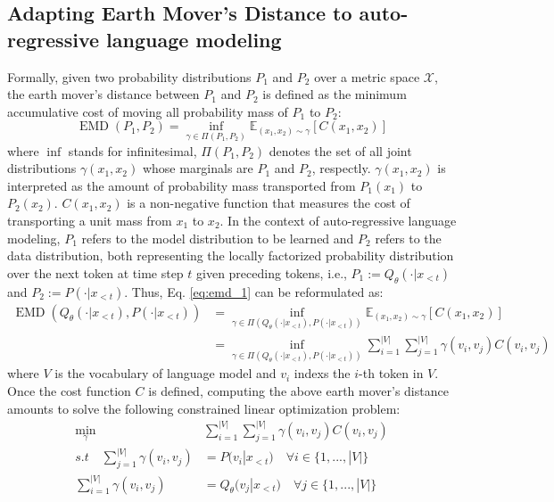 \subsection{Adapting Earth Mover's Distance to auto-regressive language modeling}
\label{sec:emd}
Formally, given two probability distributions $P_1$ and $P_2$ over a metric space $\mathcal{X}$, the earth mover's distance between $P_1$ and $P_2$ is defined as the minimum accumulative cost of moving all probability mass of $P_1$ to $P_2$:
\begin{equation}
    \operatorname{EMD}(P_1, P_2)=\inf _{\gamma \in \Pi(P_1, P_2)} \mathbb{E}_{(x_1, x_2) \sim \gamma}[C(x_1, x_2)]
    \label{eq:emd_1}
\end{equation}
where $\inf$ stands for infinitesimal, $\Pi(P_1,P_2)$ denotes the set of all joint distributions $\gamma (x_1,x_2)$ whose marginals are $P_1$ and $P_2$, respectly. $\gamma(x_1,x_2)$ is interpreted as the amount of probability mass transported from $P_1(x_1)$ to $P_2(x_2)$. $C(x_1,x_2)$ is a non-negative function that measures the cost of transporting a unit mass from $x_1$ to $x_2$. In the context of 
auto-regressive language modeling, $P_1$ refers to the model distribution to be learned and $P_2$ refers to the data distribution, both representing the locally factorized probability distribution over the next token at time step $t$ given preceding tokens, i.e., $P_1:=Q_{\theta}(\cdot|x_{<t})$ and $P_2:=P(\cdot|x_{<t})$. Thus, Eq. \ref{eq:emd_1}  can be reformulated as:
\begin{align}
    \nonumber
    \operatorname{EMD}(Q_{\theta}(\cdot|x_{<t}), P(\cdot|x_{<t}))&=\inf _{\gamma \in \Pi(Q_{\theta}(\cdot|x_{<t}), P(\cdot|x_{<t}))} \mathbb{E}_{(x_1, x_2) \sim \gamma}[C(x_1, x_2)] \\
    &=\inf _{\gamma \in \Pi(Q_{\theta}(\cdot|x_{<t}), P(\cdot|x_{<t}))}\sum_{i=1}^{|V|}\sum_{j=1}^{|V|}\gamma(v_i,v_j)C(v_i,v_j)
    \label{eq:emd_2}
\end{align}
where $V$ is the vocabulary of language model and $v_i$ indexs the $i$-th token in $V$. Once the cost function $C$ is defined, computing the above earth mover's distance amounts to solve the following constrained linear optimization problem:
\begin{align}
    \label{eq:emdlm}
    \min_{\gamma}&\sum_{i=1}^{|V|}\sum_{j=1}^{|V|}\gamma(v_i, v_j)C(v_i, v_j) \\
    \nonumber
    s.t\quad \sum_{j=1}^{|V|}\gamma(v_i, v_j)&=P(v_i|x_{<t})\quad \forall i\in\{1,...,|V|\} \\
    \nonumber
    \sum_{i=1}^{|V|}\gamma(v_i, v_j)&=Q_{\theta}(v_j|x_{<t})\quad \forall j\in\{1,...,|V|\}
\end{align}
